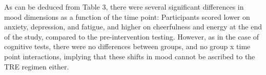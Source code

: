 \documentclass[authordate, empirical,issue]{jote-new-article}
\begin{document}
As can be deduced from Table 3, there were several significant differences in mood dimensions as a function of the time point: Participants scored lower on anxiety, depression, and fatigue, and higher on cheerfulness and energy at the end of the study, compared to the pre-intervention testing. However, as in the case of cognitive tests, there were no differences between groups, and no group x time point interactions, implying that these shifts in mood cannot be ascribed to the TRE regimen either.








\begin{table}[th!]
  \begin{fullwidth}
    \caption{Scores on mood and sleep quality questionnaires across time points for experimental and control group, and the results of mixed model repeated measures ANOVAs, with group (experimental vs. control) as a source of variance between participants and time point (1\textsuperscript{st}/2\textsuperscript{nd}/3\textsuperscript{rd}) as a within-group source of variance.
    }
\end{fullwidth}
\end{table}
\end{document}
